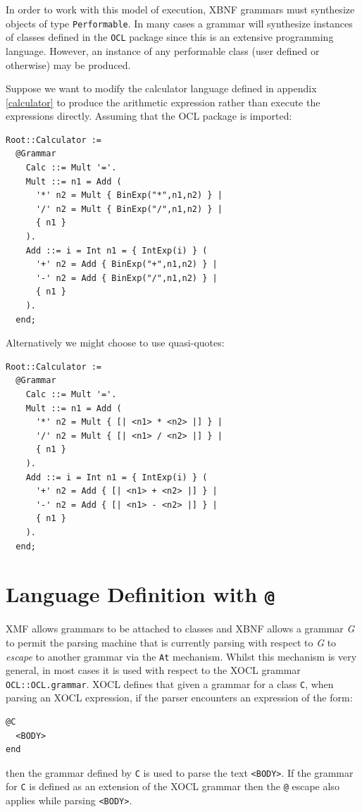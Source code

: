 \documentclass{article}
\begin{document}
In order to work with this model of execution, XBNF grammars must synthesize
objects of type {\tt Performable}. In many cases a grammar will synthesize
instances of classes defined in the {\tt OCL} package since this is an
extensive programming language. However, an instance of any performable
class (user defined or otherwise) may be produced.

Suppose we want to modify the calculator language defined in appendix
\ref{calculator} to produce the arithmetic expression rather than 
execute the expressions directly. Assuming that the OCL package is imported:
\begin{verbatim}
Root::Calculator :=
  @Grammar
    Calc ::= Mult '='. 
    Mult ::= n1 = Add ( 
      '*' n2 = Mult { BinExp("*",n1,n2) } |
      '/' n2 = Mult { BinExp("/",n1,n2) } |
      { n1 }  
    ). 
    Add ::= i = Int n1 = { IntExp(i) } ( 
      '+' n2 = Add { BinExp("+",n1,n2) } |
      '-' n2 = Add { BinExp("/",n1,n2) } |
      { n1 }  
    ).  
  end;
\end{verbatim}
Alternatively we might choose to use quasi-quotes:
\begin{verbatim}
Root::Calculator :=
  @Grammar
    Calc ::= Mult '='. 
    Mult ::= n1 = Add ( 
      '*' n2 = Mult { [| <n1> * <n2> |] } |
      '/' n2 = Mult { [| <n1> / <n2> |] } |
      { n1 }  
    ). 
    Add ::= i = Int n1 = { IntExp(i) } ( 
      '+' n2 = Add { [| <n1> + <n2> |] } |
      '-' n2 = Add { [| <n1> - <n2> |] } |
      { n1 }  
    ).  
  end;
\end{verbatim}

\section{Language Definition with {\tt @}}

XMF allows grammars to be attached to classes and XBNF allows a grammar {\em G} to permit
the parsing machine that is currently parsing with respect to {\em G} to {\em escape} to
another grammar via the {\tt At} mechanism. Whilst this mechanism is very general,
in most cases it is used with respect to the XOCL grammar {\tt OCL::OCL.grammar}. XOCL
defines that given a grammar for a class {\tt C}, when parsing an XOCL expression, if the
parser encounters an expression of the form:
\begin{verbatim}
@C
  <BODY>
end
\end{verbatim}
then the grammar defined by {\tt C} is used to parse the text {\tt <BODY>}. If the
grammar for {\tt C} is defined as an extension of the XOCL grammar then the {\tt @}
escape also applies while parsing {\tt <BODY>}.
\end{document}
